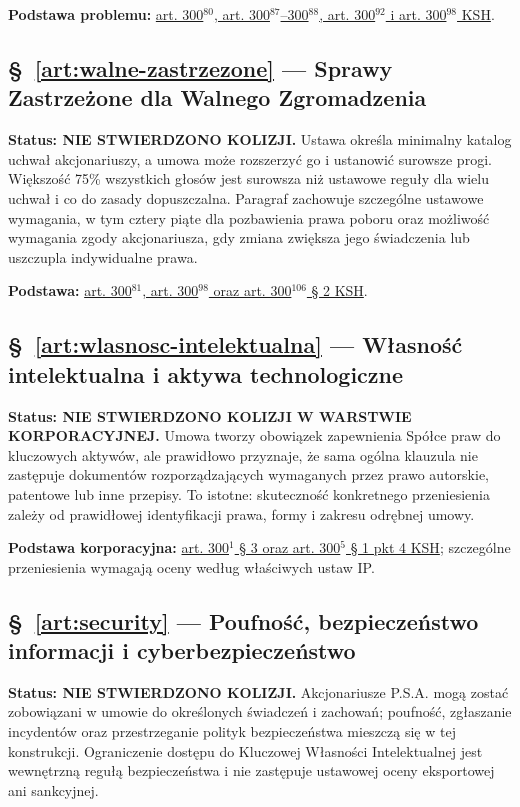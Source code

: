 \documentclass[12pt,a4paper]{report}
\begin{document}
\textbf{Podstawa problemu:} \href{https://eli.gov.pl/api/acts/DU/2024/18/text.html}{art. 300$^{80}$, art. 300$^{87}$--300$^{88}$, art. 300$^{92}$ i art. 300$^{98}$ KSH}.

\subsection*{§~\ref{art:walne-zastrzezone} — Sprawy Zastrzeżone dla Walnego Zgromadzenia}
\textbf{Status: NIE STWIERDZONO KOLIZJI.} Ustawa określa minimalny katalog uchwał akcjonariuszy, a umowa może rozszerzyć go i ustanowić surowsze progi. Większość 75\% wszystkich głosów jest surowsza niż ustawowe reguły dla wielu uchwał i co do zasady dopuszczalna. Paragraf zachowuje szczególne ustawowe wymagania, w tym cztery piąte dla pozbawienia prawa poboru oraz możliwość wymagania zgody akcjonariusza, gdy zmiana zwiększa jego świadczenia lub uszczupla indywidualne prawa.

\textbf{Podstawa:} \href{https://eli.gov.pl/api/acts/DU/2024/18/text.html}{art. 300$^{81}$, art. 300$^{98}$ oraz art. 300$^{106}$ § 2 KSH}.

\subsection*{§~\ref{art:wlasnosc-intelektualna} — Własność intelektualna i aktywa technologiczne}
\textbf{Status: NIE STWIERDZONO KOLIZJI W WARSTWIE KORPORACYJNEJ.} Umowa tworzy obowiązek zapewnienia Spółce praw do kluczowych aktywów, ale prawidłowo przyznaje, że sama ogólna klauzula nie zastępuje dokumentów rozporządzających wymaganych przez prawo autorskie, patentowe lub inne przepisy. To istotne: skuteczność konkretnego przeniesienia zależy od prawidłowej identyfikacji prawa, formy i zakresu odrębnej umowy.

\textbf{Podstawa korporacyjna:} \href{https://eli.gov.pl/api/acts/DU/2024/18/text.html}{art. 300$^{1}$ § 3 oraz art. 300$^{5}$ § 1 pkt 4 KSH}; szczególne przeniesienia wymagają oceny według właściwych ustaw IP.

\subsection*{§~\ref{art:security} — Poufność, bezpieczeństwo informacji i cyberbezpieczeństwo}
\textbf{Status: NIE STWIERDZONO KOLIZJI.} Akcjonariusze P.S.A. mogą zostać zobowiązani w umowie do określonych świadczeń i zachowań; poufność, zgłaszanie incydentów oraz przestrzeganie polityk bezpieczeństwa mieszczą się w tej konstrukcji. Ograniczenie dostępu do Kluczowej Własności Intelektualnej jest wewnętrzną regułą bezpieczeństwa i nie zastępuje ustawowej oceny eksportowej ani sankcyjnej.
\end{document}
